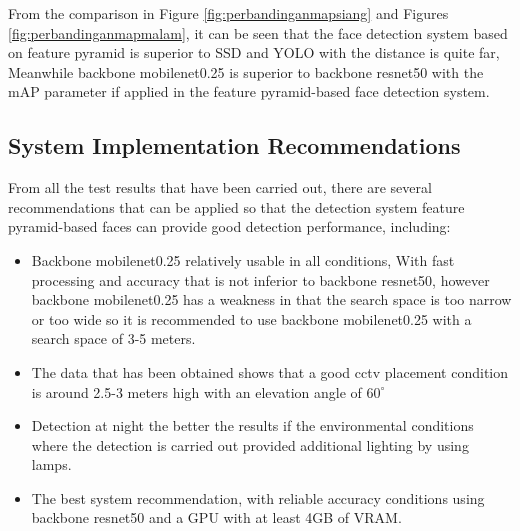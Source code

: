 From the comparison in Figure \ref{fig:perbandinganmapsiang} and Figures \ref{fig:perbandinganmapmalam}, it can be seen that the face detection system based on feature pyramid 
is superior to SSD and YOLO with 
the distance is quite far, Meanwhile backbone mobilenet0.25 is superior to backbone resnet50 with the mAP parameter if applied
in the feature pyramid-based face detection system.

\subsection{System Implementation Recommendations}

From all the test results that have been carried out, there are
several recommendations that can be applied so that the detection system 
feature pyramid-based faces can provide good detection performance, including:

\begin{itemize}
  \item Backbone mobilenet0.25 relatively usable in all conditions, With fast processing
  and accuracy that is not inferior to backbone resnet50, however backbone mobilenet0.25 has a weakness in that the search space is too narrow or too wide
  so it is recommended to use backbone mobilenet0.25 with a search space of 3-5 meters.
  \item The data that has been obtained shows that a good cctv placement condition is around 2.5-3 meters high with an elevation angle of $60^\circ$
  \item Detection at night the better the results if the environmental conditions where the detection is carried out
  provided additional lighting by using lamps.
  \item The best system recommendation, with reliable accuracy conditions using backbone resnet50 and a GPU with at least 4GB of VRAM.
\end{itemize}

